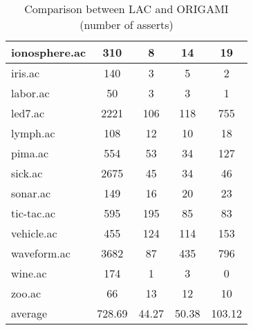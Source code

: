 \begin{table}[htbp]
\begin{tabular}{|l|c|c|c|c|}
		\hline
		ionosphere.ac   & 310           & 8                  & 14                       & 19                            \\
		\hline
		iris.ac         & 140           & 3                  & 5                        & 2                             \\
		\hline
		labor.ac        & 50            & 3                  & 3                        & 1                             \\
		\hline
		led7.ac         & 2221          & 106                & 118                      & 755                           \\
		\hline
		lymph.ac        & 108           & 12                 & 10                       & 18                            \\
		\hline
		pima.ac         & 554           & 53                 & 34                       & 127                           \\
		\hline
		sick.ac         & 2675          & 45                 & 34                       & 46                            \\
		\hline
		sonar.ac        & 149           & 16                 & 20                       & 23                            \\
		\hline
		tic-tac.ac      & 595           & 195                & 85                       & 83                            \\
		\hline
		vehicle.ac      & 455           & 124                & 114                      & 153                           \\
		\hline
		waveform.ac     & 3682          & 87                 & 435                      & 796                           \\
		\hline
		wine.ac         & 174           & 1                  & 3                        & 0                             \\
		\hline
		zoo.ac          & 66            & 13                 & 12                       & 10                            \\
		\hline
		average         & 728.69        & 44.27              & 50.38                    & 103.12                        \\
		\hline
		\end{tabular}
	\caption{Comparison between LAC and ORIGAMI (number of asserts)}
	\label{tab:comparison_lac_origami}
\end{table}